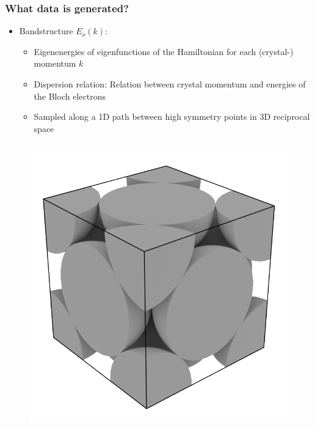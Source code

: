 \begin{frame}\frametitle{What data is generated?}
\begin{itemize}
    

\item Bandstructure $E_{\nu}(k)$:
\begin{itemize}
    \item Eigenenergies of eigenfunctions of the Hamiltonian for each (crystal-) momentum $k$
    \item Dispersion relation: Relation between crystal momentum and energies of the Bloch electrons
    \item Sampled along a 1D path between high symmetry points in 3D reciprocal space 
\end{itemize}
\end{itemize}

\begin{column}{.5\textwidth}
\begin{figure}
   \includegraphics[width=0.7\linewidth]{fig/fcc_real.png}
\end{figure}


\end{column}
\end{frame}
